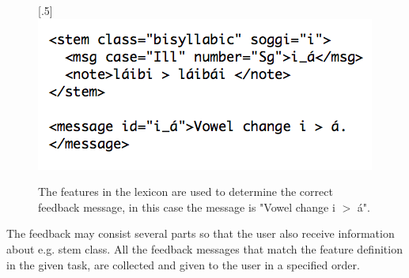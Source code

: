 \documentclass[11pt]{article}
\begin{document}
\begin{figure}[htbp]
\begin{center}
\scalebox{.5}[.5]{\includegraphics{presentation/img/morphfeedbackEng.png}}\\
\caption{The features in the lexicon are used to determine the correct feedback message, in this case the message is "Vowel change i $>$ á".}
\label{feedbacknouns}
\end{center}
\end{figure}

The feedback may consist several parts so that the user also receive information about e.g. stem class. All the feedback messages that match the feature definition in the given task, are collected and given to the user in a specified order. 

%
\end{document}
